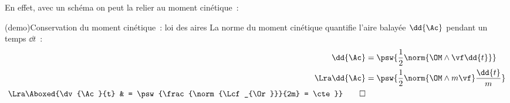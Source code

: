\documentclass[../../main/main.tex]{subfiles}
\begin{document}
En effet, avec un schéma on peut la relier au moment cinétique~:
\begin{tcb*}[sidebyside](demo){Conservation du moment cinétique~: loi des aires}
	La norme du moment cinétique quantifie l'aire balayée $\dd{\Ac}$ pendant un
	temps $\dd{t}$~:
	\begin{align*}
		\dd{\Ac}            & = \psw{\frac{1}{2}\norm{\OM \wedge \vf \dd{t}}}
		\\\Lra
		\dd{\Ac}            & = \psw{\frac{1}{2}\norm{\OM \wedge m \vf} \frac{\dd{t}}{m}}
		\\\Lra
		\Aboxed{\dv{\Ac}{t} & = \psw{\frac{\norm{\Lcf_{\Or}}}{2m} = \cte}}
		\qed
	\end{align*}
	\tcblower
	\begin{center}
\end{center}
\end{tcb*}
\end{document}
